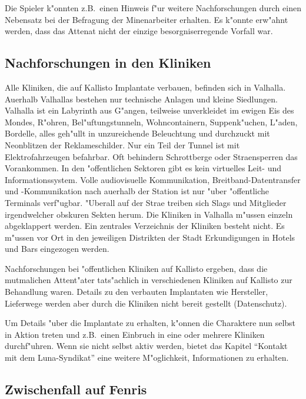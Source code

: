 \begin{remarks}
	Die Spieler k"onnten z.B.~einen Hinweis f"ur weitere Nachforschungen durch einen Nebensatz bei der Befragung der Minenarbeiter erhalten. Es k"onnte erw"ahnt werden, dass das Attenat nicht der einzige besorgniserregende Vorfall war.
\end{remarks}


\subsection{Nachforschungen in den Kliniken}

Alle Kliniken, die auf Kallisto Implantate verbauen, befinden sich in Valhalla. Au\3erhalb Valhallas bestehen nur technische Anlagen und kleine Siedlungen. Valhalla ist ein Labyrinth aus G"angen, teilweise unverkleidet im ewigen Eis des Mondes, R"ohren, Bel"uftungstunneln, Wohncontainern, Suppenk"uchen, L"aden, Bordelle, alles geh"ullt in unzureichende Beleuchtung und durchzuckt mit Neonblitzen der Reklameschilder. Nur ein Teil der Tunnel ist mit Elektrofahrzeugen befahrbar. Oft behindern Schrottberge oder Stra\3ensperren das Vorankommen. In den "offentlichen Sektoren gibt es kein virtuelles Leit- und Informationssystem. Volle audiovisuelle Kommunikation, Breitband-Datentransfer und -Kommunikation nach au\3erhalb der Station ist nur "uber "offentliche Terminals verf"ugbar. "Uberall auf der Stra\3e treiben sich Slags und Mitglieder irgendwelcher obskuren Sekten herum. Die Kliniken in Valhalla m"ussen einzeln abgeklappert werden. Ein zentrales Verzeichnis der Kliniken besteht nicht. Es m"ussen vor Ort in den jeweiligen Distrikten der Stadt Erkundigungen in Hotels und Bars eingezogen werden.

Nachforschungen bei "offentlichen Kliniken auf Kallisto ergeben, dass die mutma\3lichen Attent"ater tats"achlich in verschiedenen Kliniken auf Kallisto zur Behandlung waren. Details zu den verbauten Implantaten wie Hersteller, Lieferwege werden aber durch die Kliniken nicht bereit gestellt (Datenschutz).

\begin{remarks}
	Um Details "uber die Implantate zu erhalten, k"onnen die Charaktere nun selbst in Aktion treten und z.B.~einen Einbruch in eine oder mehrere Kliniken durchf"uhren. Wenn sie nicht selbst aktiv werden, bietet das Kapitel "`Kontakt mit dem Luna-Syndikat"' eine weitere M"oglichkeit, Informationen zu erhalten.
\end{remarks}


\subsection{Zwischenfall auf Fenris}

